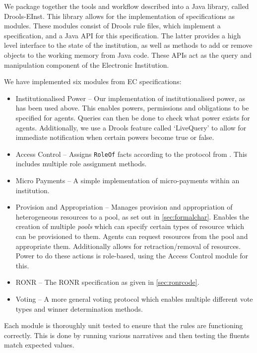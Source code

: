 We package together the tools and workflow described into a Java library,
called Drools-EInst. This library allows for the implementation of
specifications as modules. These modules consist of Drools rule files, which
implement a specification, and a Java \ac{API} for this specification. The
latter provides a high level interface to the state of the institution, as
well as methods to add or remove objects to the working memory from Java code.
These \ac{API}s act as the query and manipulation component of the Electronic
Institution.

We have implemented six modules from \ac{EC} specifications:

\begin{itemize}
\item Institutionalised Power -- Our implementation of institutionalised power, as has been used above. This enables powers, permissions and obligations to be specified for agents. Queries can then be done to check what power exists for agents. Additionally, we use a Drools feature called `LiveQuery' to allow for immediate notification when certain powers become true or false.
\item Access Control -- Assigns \texttt{RoleOf} facts according to the protocol from \citet{Pitt2012b}. This includes multiple role assignment methods.
\item Micro Payments -- A simple implementation of micro-payments within an institution.
\item Provision and Appropriation -- Manages provision and appropriation of heterogeneous resources to a pool, as set out in \autoref{sec:formalchar}. Enables the creation of multiple \emph{pools} which can specify certain types of resource which can be provisioned to them. Agents can request resources from the pool and appropriate them. Additionally allows for retraction/removal of resources. Power to do these actions is role-based, using the Access Control module for this.
\item \ac{RONR} -- The \ac{RONR} specification as given in \autoref{sec:ronrcode}.
\item Voting -- A more general voting protocol which enables multiple different vote types and winner determination methods.
\end{itemize}

Each module is thoroughly unit tested to ensure that the rules are functioning
correctly. This is done by running various narratives and then testing the
fluents match expected values.

